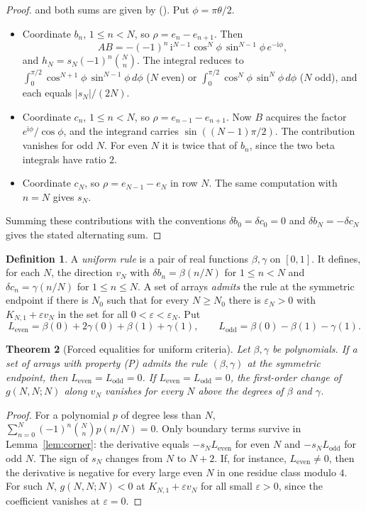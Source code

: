 \documentclass[twoside,10pt]{article}
\numberwithin{equation}{section}
\theoremstyle{slbody}
\newtheorem{theorem}{Theorem}[section]
\theoremstyle{definition}
\newtheorem{definition}[theorem]{Definition}
\theoremstyle{remark}
\renewcommand{\eqref}[1]{\textup{{\normalfont(\oldstylenums{\ref{#1}}}\normalfont)}}
\begin{document}
\begin{proof}
and both sums are given by \eqref{eq:kraw-gf}. Put $\phi=\pi\theta/2$.
\begin{itemize}
\item Coordinate $b_n$, $1\leq n<N$, so $\rho=e_n-e_{n+1}$. Then
\[
AB=-(-1)^n\,\mathrm i^{N-1}\cos^N\!\phi\,\sin^{N-1}\!\phi\,e^{-\mathrm i\phi},
\]
and $h_N=s_N(-1)^n\binom Nn$. The integral reduces to $\int_0^{\pi/2}\cos^{N+1}\!\phi\,\sin^{N-1}\!\phi\,d\phi$ ($N$ even) or $\int_0^{\pi/2}\cos^{N}\!\phi\,\sin^{N}\!\phi\,d\phi$ ($N$ odd), and each equals $|s_N|/(2N)$.
\item Coordinate $c_n$, $1\leq n<N$, so $\rho=e_{n-1}-e_{n+1}$. Now $B$ acquires the factor $e^{\mathrm i\phi}/\cos\phi$, and the integrand carries $\sin((N-1)\pi/2)$. The contribution vanishes for odd $N$. For even $N$ it is twice that of $b_n$, since the two beta integrals have ratio $2$.
\item Coordinate $c_N$, so $\rho=e_{N-1}-e_N$ in row $N$. The same computation with $n=N$ gives $s_N$.
\end{itemize}
Summing these contributions with the conventions $\delta b_0=\delta c_0=0$ and $\delta b_N=-\delta c_N$ gives the stated alternating sum.
\end{proof}

\begin{definition}\label{def:rule}
A \emph{uniform rule} is a pair of real functions $\beta,\gamma$ on $[0,1]$. It defines, for each $N$, the direction $v_N$ with $\delta b_n=\beta(n/N)$ for $1\leq n<N$ and $\delta c_n=\gamma(n/N)$ for $1\leq n\leq N$. A set of arrays \emph{admits} the rule at the symmetric endpoint if there is $N_0$ such that for every $N\geq N_0$ there is $\varepsilon_N>0$ with $K_{N,1}+\varepsilon v_N$ in the set for all $0<\varepsilon<\varepsilon_N$. Put
\[
L_{\mathrm{even}}=\beta(0)+2\gamma(0)+\beta(1)+\gamma(1),\qquad L_{\mathrm{odd}}=\beta(0)-\beta(1)-\gamma(1).
\]
\end{definition}

\begin{theorem}[Forced equalities for uniform criteria]\label{thm:uniform}
Let $\beta,\gamma$ be polynomials. If a set of arrays with property (P) admits the rule $(\beta,\gamma)$ at the symmetric endpoint, then $L_{\mathrm{even}}=L_{\mathrm{odd}}=0$. If $L_{\mathrm{even}}=L_{\mathrm{odd}}=0$, the first-order change of $g(N,N;N)$ along $v_N$ vanishes for every $N$ above the degrees of $\beta$ and $\gamma$.
\end{theorem}
\begin{proof}
For a polynomial $p$ of degree less than $N$, $\sum_{n=0}^N(-1)^n\binom Nnp(n/N)=0$. Only boundary terms survive in Lemma~\ref{lem:corner}: the derivative equals $-s_NL_{\mathrm{even}}$ for even $N$ and $-s_NL_{\mathrm{odd}}$ for odd $N$. The sign of $s_N$ changes from $N$ to $N+2$. If, for instance, $L_{\mathrm{even}}\neq0$, then the derivative is negative for every large even $N$ in one residue class modulo $4$. For such $N$, $g(N,N;N)<0$ at $K_{N,1}+\varepsilon v_N$ for all small $\varepsilon>0$, since the coefficient vanishes at $\varepsilon=0$.
\end{proof}
\end{document}
